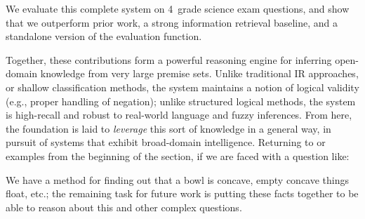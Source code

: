 \begin{center}
\end{center}


We evaluate this complete system on 4\nth\ grade science exam questions, and show that we 
  outperform prior work, a strong information retrieval baseline, and a 
  standalone version of the evaluation function.



%
%
Together, these contributions form a powerful reasoning engine for inferring open-domain
  knowledge from very large premise sets.
Unlike traditional IR approaches, or shallow classification methods, the system maintains
  a notion of logical validity (e.g., proper handling of negation);
  unlike structured logical methods, the system is high-recall and robust to
  real-world language and fuzzy inferences.
From here, the foundation is laid to \textit{leverage} this sort of knowledge in a
  general way, in pursuit of systems that exhibit broad-domain intelligence.
Returning to or examples from the beginning of the section, if we are faced with a question like:

\begin{displayquote}
\end{displayquote}

We have a method for finding out that a bowl is concave, empty concave things float, etc.;
  the remaining task for future work is putting these facts together to be able to reason about
  this and other complex questions.
